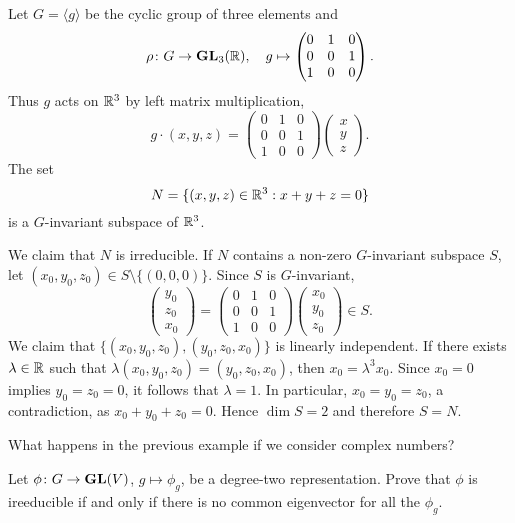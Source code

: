 \begin{example}
Let $G=\langle g\rangle$ be the cyclic group of three elements and 
\[
\rho\colon G\to\mathbf{GL}_3(\mathbb{R}),\quad
g\mapsto\begin{pmatrix}
  0&1&0\\
  0&0&1\\
  1&0&0
\end{pmatrix}.
\]
Thus $g$ acts on $\mathbb{R}^{3}$ by left matrix multiplication,
\[
g\cdot (x,y,z)=
\begin{pmatrix}
  0&1&0\\
  0&0&1\\
  1&0&0
\end{pmatrix}\begin{pmatrix}
x\\
y\\
z
\end{pmatrix}.
\]
The set 
\[
N=\{(x,y,z)\in\mathbb{R}^{3}:x+y+z=0\}
\]
is a $G$-invariant subspace of $\mathbb{R}^3$. 

We claim that $N$ is irreducible. 
If $N$ contains a non-zero $G$-invariant subspace $S$, 
let $(x_0,y_0,z_0)\in S\setminus\{(0,0,0)\}$. Since $S$ is $G$-invariant, 
\[
\begin{pmatrix}
y_0\\
z_0\\
x_0
\end{pmatrix}
=
\begin{pmatrix}
  0&1&0\\
  0&0&1\\
  1&0&0
\end{pmatrix}
\begin{pmatrix}
x_0\\
y_0\\
z_0
\end{pmatrix}\in S.
\]
We claim that $\{(x_0,y_0,z_0),(y_0,z_0,x_0)\}$ is linearly independent. If there exists $\lambda\in\mathbb{R}$ 
such that $\lambda(x_0,y_0,z_0)=(y_0,z_0,x_0)$, then $x_0=\lambda^3 x_0$. Since $x_0=0$ implies 
$y_0=z_0=0$, it follows that $\lambda=1$. In particular, $x_0=y_0=z_0$, a contradiction, as $x_0+y_0+z_0=0$. 
Hence $\dim S=2$ and therefore $S=N$. 
\end{example}

What happens in the previous example if we consider complex numbers?

\begin{exercise}
  \label{xca:deg2}
  Let $\phi\colon G\to \mathbf{GL}(V)$, $g\mapsto\phi_g$, be a degree-two representation. Prove that
  $\phi$ is ireeducible if and only if there is no common eigenvector for all the $\phi_g$.
\end{exercise}

